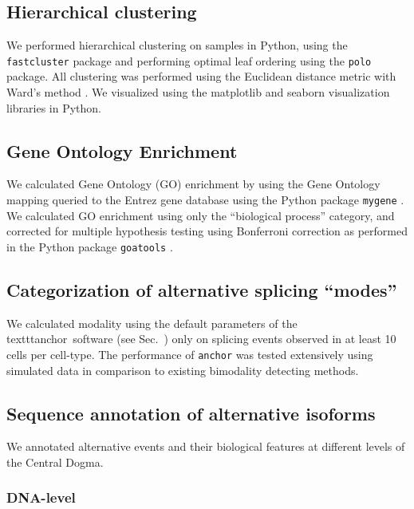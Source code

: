 \subsection{Hierarchical clustering}

We performed hierarchical clustering on samples in Python, using the \texttt{fastcluster} \cite{Mullner:2013bl} package and performing optimal leaf ordering \cite{BarJoseph:2001tr} using the \texttt{polo} \cite{Anonymous:2FB4UNR9} package. All clustering was performed using the Euclidean distance metric with Ward's method \cite{WardJr:2012te}. We visualized using the matplotlib \cite{Anonymous:matplotlib} and seaborn \cite{Anonymous:hWlQiCz3} visualization libraries in Python.

\subsection{Gene Ontology Enrichment}
We calculated Gene Ontology (GO) enrichment by using the Gene Ontology mapping queried to the Entrez gene database using the Python package \texttt{mygene} \cite{Wu:2012bo,Xin:2016fv}. We calculated GO enrichment using only the ``biological process'' category, and corrected for multiple hypothesis testing using Bonferroni correction as performed in the Python package \texttt{goatools} \cite{Tang:2015ub}.

\subsection{Categorization of alternative splicing ``modes''}
We calculated modality using the default parameters of the \\texttt{anchor}\, software (see Sec.~) only on splicing events observed in at least 10 cells per cell-type. The performance of \texttt{anchor} was tested extensively using simulated data in comparison to existing bimodality detecting methods.

\subsection{Sequence annotation of alternative isoforms}

We annotated alternative events and their biological features at different levels of the Central Dogma.

\subsubsection{DNA-level}

